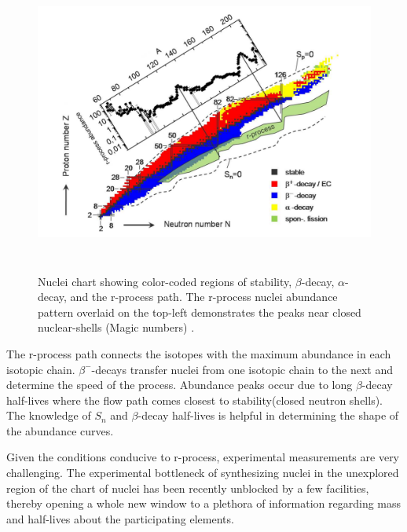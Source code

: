 \begin{figure}[h]
	\centering
	\includegraphics[width=15cm, height=10cm]{figures/r_process_path_way.png}
	\caption[Nuclei chart showing color-coded regions of stability]{Nuclei chart showing color-coded regions of stability, $\beta$-decay, $\alpha$-decay, and the r-process path. The r-process nuclei abundance pattern overlaid on the top-left demonstrates the peaks near closed nuclear-shells (Magic numbers) \citep{newmagicnumbers}.}
	\label{fig:r_process}
\end{figure}
The r-process path connects the isotopes with the maximum abundance in each isotopic chain. $\beta^{-}$-decays transfer nuclei from one isotopic chain to the next and determine the speed of the process. Abundance peaks occur due to long $\beta$-decay half-lives where the flow path comes closest to stability(closed neutron shells). The knowledge of $S_{n}$ and $\beta$-decay half-lives is helpful in determining the shape of the abundance curves.

Given the conditions conducive to r-process, experimental measurements are very challenging. The experimental bottleneck of synthesizing nuclei in the unexplored region of the chart of nuclei has been recently unblocked by a few facilities, thereby opening a whole new window to a plethora of information regarding mass and half-lives about the participating elements.

